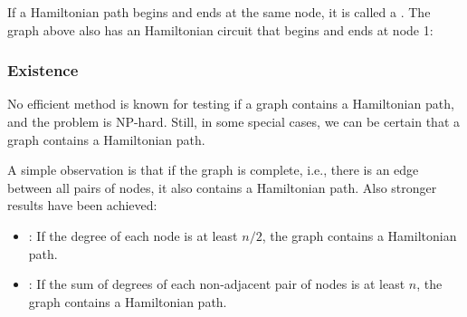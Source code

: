 If a Hamiltonian path begins and ends at the same node,
it is called a .
The graph above also has an Hamiltonian circuit
that begins and ends at node 1:
\begin{center}
\end{center}

\subsubsection{Existence}

No efficient method is known for testing if a graph
contains a Hamiltonian path, and the problem is NP-hard.
Still, in some special cases, we can be certain
that a graph contains a Hamiltonian path.

A simple observation is that if the graph is complete,
i.e., there is an edge between all pairs of nodes,
it also contains a Hamiltonian path.
Also stronger results have been achieved:

\begin{itemize}
\item
{}
: %
If the degree of each node is at least $n/2$,
the graph contains a Hamiltonian path.
\item
{}
: %
If the sum of degrees of each non-adjacent pair of nodes
is at least $n$,
the graph contains a Hamiltonian path.
\end{itemize}

